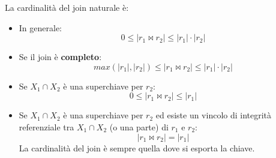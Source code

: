 \documentclass[a4paper,twoside]{article}
\begin{document}
La cardinalità del join naturale è:
\begin{itemize}
  \item In generale:
    \[
      0 \leq |r_1 \bowtie r_2| \leq |r_1| \cdot |r_2|
    \]

  \item Se il join è \textbf{completo}:
    \[
      max(|r_1|, |r_2|) \leq |r_1 \bowtie r_2| \leq |r_1| \cdot |r_2|
    \]

  \item Se \( X_1 \cap X_2 \) è una superchiave per \( r_2 \):
    \[
      0 \leq |r_1 \bowtie r_2| \leq |r_1|
    \]

  \item Se \( X_1 \cap X_2 \) è una superchiave per \( r_2 \) ed esiste un vincolo
    di integrità referenziale tra \( X_1 \cap X_2 \) (o una parte) di \( r_1 \) e \( r_2 \):
    \[
      |r_1 \bowtie r_2| = |r_1|
    \]
    La cardinalità del join è sempre quella dove si esporta la chiave.
\end{itemize}
\end{document}
